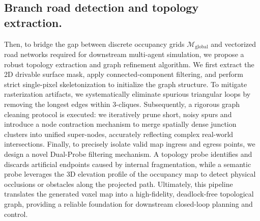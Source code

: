 \subsection{Branch road detection and topology extraction.} Then, to bridge the gap between discrete occupancy grids $\mathcal{M}_{\text{global}}$ and vectorized road networks required for downstream multi-agent simulation, we propose a robust topology extraction and graph refinement algorithm. We first extract the 2D drivable surface mask, apply connected-component filtering, and perform strict single-pixel skeletonization to initialize the graph structure. To mitigate rasterization artifacts, we systematically eliminate spurious triangular loops by removing the longest edges within 3-cliques. Subsequently, a rigorous graph cleaning protocol is executed: we iteratively prune short, noisy spurs and introduce a node contraction mechanism to merge spatially dense junction clusters into unified super-nodes, accurately reflecting complex real-world intersections. Finally, to precisely isolate valid map ingress and egress points, we design a novel Dual-Probe filtering mechanism. A topology probe identifies and discards artificial endpoints caused by internal fragmentation, while a semantic probe leverages the 3D elevation profile of the occupancy map to detect physical occlusions or obstacles along the projected path. Ultimately, this pipeline translates the generated voxel map into a high-fidelity, deadlock-free topological graph, providing a reliable foundation for downstream closed-loop planning and control.

